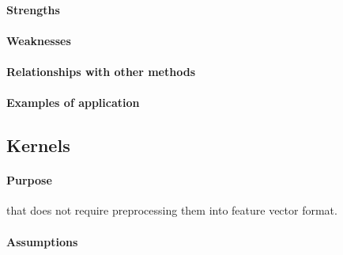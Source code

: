 \paragraph{Strengths}
\paragraph{Weaknesses}
\paragraph{Relationships with other methods}
\paragraph{Examples of application}


\subsection{Kernels}
\paragraph{Purpose}
 that does not require preprocessing them 
into feature vector format.

\paragraph{Assumptions}
